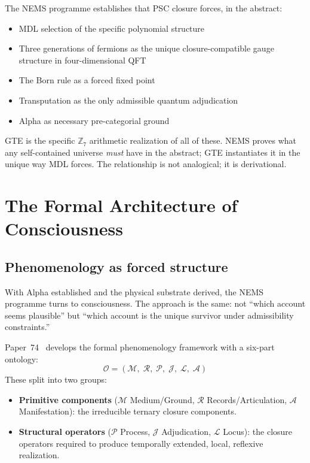 \documentclass[11pt]{article}
\theoremstyle{remark}
\newcommand{\OntM}{\mathcal{M}}
\newcommand{\OntR}{\mathcal{R}}
\newcommand{\OntP}{\mathcal{P}}
\newcommand{\OntJ}{\mathcal{J}}
\newcommand{\OntL}{\mathcal{L}}
\newcommand{\OntA}{\mathcal{A}}
\newcommand{\Ont}{\mathcal{O}}
\begin{document}
The NEMS programme establishes that PSC closure forces, in the abstract:

\begin{itemize}
  \item MDL selection of the specific polynomial structure
  \item Three generations of fermions as the unique closure-compatible gauge structure
    in four-dimensional QFT
  \item The Born rule as a forced fixed point~\cite{SpivackNEMS13}
  \item Transputation as the only admissible quantum adjudication~\cite{SpivackNEMS76}
  \item Alpha as necessary pre-categorial ground~\cite{SpivackNEMS63}
\end{itemize}

GTE is the specific $\mathbb{Z}_7$ arithmetic realization of all of these. NEMS
proves what any self-contained universe \emph{must} have in the abstract; GTE
instantiates it in the unique way MDL forces. The relationship is not analogical;
it is derivational.

\section{The Formal Architecture of Consciousness}\label{sec:phenom}

\subsection{Phenomenology as forced structure}

With Alpha established and the physical substrate derived, the NEMS programme turns
to consciousness. The approach is the same: not ``which account seems plausible'' but
``which account is the unique survivor under admissibility constraints.''

Paper~74~\cite{SpivackNEMS74} develops the formal phenomenology framework with a
six-part ontology:
\[
  \Ont = (\OntM,\; \OntR,\; \OntP,\; \OntJ,\; \OntL,\; \OntA)
\]
These split into two groups:

\begin{itemize}
  \item \textbf{Primitive components} ($\OntM$ Medium/Ground, $\OntR$ Records/Articulation,
    $\OntA$ Manifestation): the irreducible ternary closure components.
  \item \textbf{Structural operators} ($\OntP$ Process, $\OntJ$ Adjudication,
    $\OntL$ Locus): the closure operators required to produce temporally extended,
    local, reflexive realization.
\end{itemize}
\end{document}
